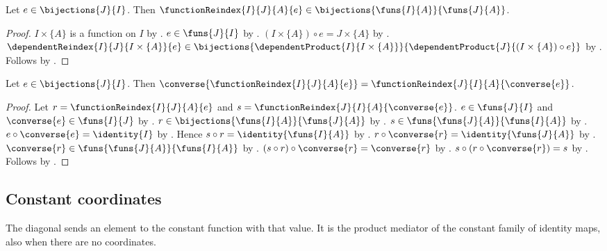 \begin{theorem}\label{function_reindex_bijection}
    Let $e\in\bijections{J}{I}$.
    Then $\functionReindex{I}{J}{A}{e}\in\bijections{\funs{I}{A}}{\funs{J}{A}}$.
\end{theorem}
\begin{proof}
    $I\times\{A\}$ is a function on $I$ by
        .
    $e\in\funs{J}{I}$ by .
    $(I\times\{A\})\circ e=J\times\{A\}$ by
        .
    $\dependentReindex{I}{J}{I\times\{A\}}{e}\in
        \bijections{\dependentProduct{I}{I\times\{A\}}}{
            \dependentProduct{J}{(I\times\{A\})\circ e}}$ by
        .
    Follows by .
\end{proof}

\begin{theorem}\label{function_reindex_converse}
    Let $e\in\bijections{J}{I}$.
    Then $\converse{\functionReindex{I}{J}{A}{e}}
        =\functionReindex{J}{I}{A}{\converse{e}}$.
\end{theorem}
\begin{proof}
    Let $r=\functionReindex{I}{J}{A}{e}$ and
        $s=\functionReindex{J}{I}{A}{\converse{e}}$.
    $e\in\funs{J}{I}$ and $\converse{e}\in\funs{I}{J}$ by
        .
    $r\in\bijections{\funs{I}{A}}{\funs{J}{A}}$ by
        .
    $s\in\funs{\funs{J}{A}}{\funs{I}{A}}$ by
        .
    $e\circ\converse{e}=\identity{I}$ by .
    Hence $s\circ r=\identity{\funs{I}{A}}$ by
        .
    $r\circ\converse{r}=\identity{\funs{J}{A}}$ by
        .
    $\converse{r}\in\funs{\funs{J}{A}}{\funs{I}{A}}$ by
        .
    $(s\circ r)\circ\converse{r}=\converse{r}$ by
        .
    $s\circ(r\circ\converse{r})=s$ by .
    Follows by .
\end{proof}

\subsection{Constant coordinates}

The diagonal sends an element to the constant function with that value. It is
the product mediator of the constant family of identity maps, also when there
are no coordinates.

